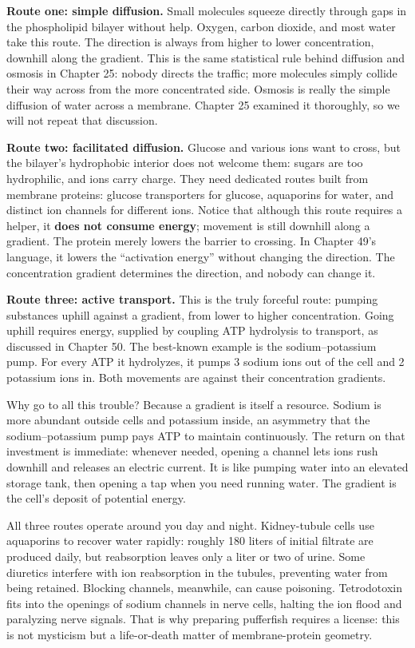 \textbf{Route one: simple diffusion.} Small molecules squeeze directly through gaps in the phospholipid bilayer without help. Oxygen, carbon dioxide, and most water take this route. The direction is always from higher to lower concentration, downhill along the gradient. This is the same statistical rule behind diffusion and osmosis in Chapter 25: nobody directs the traffic; more molecules simply collide their way across from the more concentrated side. Osmosis is really the simple diffusion of water across a membrane. Chapter 25 examined it thoroughly, so we will not repeat that discussion.

\textbf{Route two: facilitated diffusion.} Glucose and various ions want to cross, but the bilayer's hydrophobic interior does not welcome them: sugars are too hydrophilic, and ions carry charge. They need dedicated routes built from membrane proteins: glucose transporters for glucose, aquaporins for water, and distinct ion channels for different ions. Notice that although this route requires a helper, it \textbf{does not consume energy}; movement is still downhill along a gradient. The protein merely lowers the barrier to crossing. In Chapter 49's language, it lowers the ``activation energy'' without changing the direction. The concentration gradient determines the direction, and nobody can change it.

\textbf{Route three: active transport.} This is the truly forceful route: pumping substances uphill against a gradient, from lower to higher concentration. Going uphill requires energy, supplied by coupling ATP hydrolysis to transport, as discussed in Chapter 50. The best-known example is the sodium--potassium pump. For every ATP it hydrolyzes, it pumps 3 sodium ions out of the cell and 2 potassium ions in. Both movements are against their concentration gradients.

Why go to all this trouble? Because a gradient is itself a resource. Sodium is more abundant outside cells and potassium inside, an asymmetry that the sodium--potassium pump pays ATP to maintain continuously. The return on that investment is immediate: whenever needed, opening a channel lets ions rush downhill and releases an electric current. It is like pumping water into an elevated storage tank, then opening a tap when you need running water. The gradient is the cell's deposit of potential energy.

All three routes operate around you day and night. Kidney-tubule cells use aquaporins to recover water rapidly: roughly 180 liters of initial filtrate are produced daily, but reabsorption leaves only a liter or two of urine. Some diuretics interfere with ion reabsorption in the tubules, preventing water from being retained. Blocking channels, meanwhile, can cause poisoning. Tetrodotoxin fits into the openings of sodium channels in nerve cells, halting the ion flood and paralyzing nerve signals. That is why preparing pufferfish requires a license: this is not mysticism but a life-or-death matter of membrane-protein geometry.

